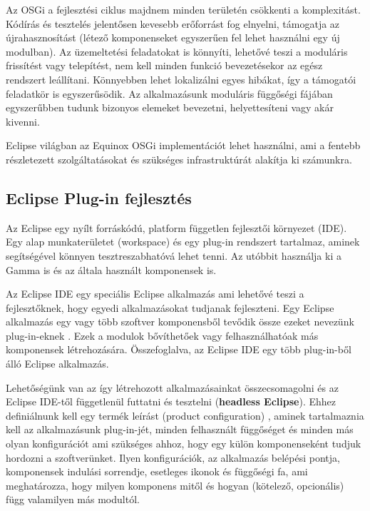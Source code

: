 Az OSGi a fejlesztési ciklus majdnem minden területén csökkenti a komplexitást. Kódírás és tesztelés jelentősen kevesebb erőforrást fog elnyelni, támogatja az újrahasznosítást (létező komponenseket egyszerűen fel lehet használni egy új modulban). Az üzemeltetési feladatokat is könnyíti, lehetővé teszi a moduláris frissítést vagy telepítést, nem kell minden funkció bevezetésekor az egész rendszert leállítani. Könnyebben lehet lokalizálni egyes hibákat, így a támogatói feladatkör is egyszerűsödik. Az alkalmazásunk moduláris függőségi fájában egyszerűbben tudunk bizonyos elemeket bevezetni, helyettesíteni vagy akár kivenni.

Eclipse világban az Equinox \cite{committers} OSGi implementációt lehet használni, ami a fentebb részletezett szolgáltatásokat és szükséges infrastruktúrát alakítja ki számunkra.

\subsection{Eclipse Plug-in fejlesztés}

Az Eclipse egy nyílt forráskódú, platform független fejlesztői környezet (IDE). Egy alap munkaterületet (workspace) és egy plug-in rendszert tartalmaz, aminek segítségével könnyen tesztreszabhatóvá lehet tenni. Az utóbbit használja ki a Gamma is és az általa használt komponensek is. 

Az Eclipse IDE egy speciális Eclipse alkalmazás ami lehetővé teszi a fejlesztőknek, hogy egyedi alkalmazásokat tudjanak fejleszteni. Egy Eclipse alkalmazás egy vagy több szoftver komponensből tevődik össze ezeket nevezünk plug-in-eknek \cite{plugin}. Ezek a modulok bővíthetőek vagy felhasználhatóak más komponensek létrehozására. Összefoglalva, az Eclipse IDE egy több plug-in-ből álló Eclipse alkalmazás.

Lehetőségünk van az így létrehozott alkalmazásainkat összecsomagolni és az Eclipse IDE-től függetlenül futtatni és tesztelni (\textbf{headless Eclipse}).
Ehhez definiálnunk kell egy termék leírást (product configuration) \cite{product}, aminek tartalmaznia kell az alkalmazásunk plug-in-jét, minden felhasznált függőséget és minden más olyan konfigurációt ami szükséges ahhoz, hogy egy külön komponenseként tudjuk hordozni a szoftverünket. Ilyen konfigurációk, az alkalmazás belépési pontja, komponensek indulási sorrendje, esetleges ikonok és függőségi fa, ami meghatározza, hogy milyen komponens mitől és hogyan (kötelező, opcionális) függ valamilyen más modultól.

